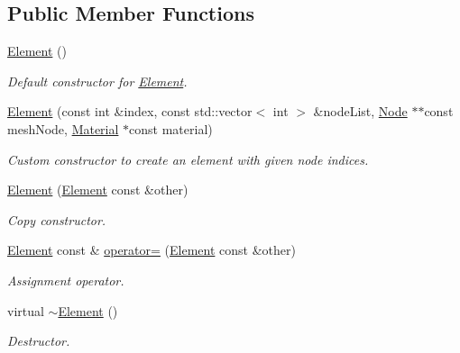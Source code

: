 \subsection*{Public Member Functions}
\begin{DoxyCompactItemize}
\item 
\mbox{\label{class_element_ab0d0e20be9a36ae676202db753faeec9}} 
\mbox{\hyperlink{class_element_ab0d0e20be9a36ae676202db753faeec9}{Element}} ()
\begin{DoxyCompactList}\small\item\em Default constructor for \mbox{\hyperlink{class_element}{Element}}. \end{DoxyCompactList}\item 
\mbox{\hyperlink{class_element_aed93d541257fa2ddd3cd2202fec48bb4}{Element}} (const int \&index, const std\+::vector$<$ int $>$ \&node\+List, \mbox{\hyperlink{class_node}{Node}} $\ast$$\ast$const mesh\+Node, \mbox{\hyperlink{class_material}{Material}} $\ast$const material)
\begin{DoxyCompactList}\small\item\em Custom constructor to create an element with given node indices. \end{DoxyCompactList}\item 
\mbox{\label{class_element_a68700ab3d0e5551cb456e91c3a8fc61b}} 
\mbox{\hyperlink{class_element_a68700ab3d0e5551cb456e91c3a8fc61b}{Element}} (\mbox{\hyperlink{class_element}{Element}} const \&other)
\begin{DoxyCompactList}\small\item\em Copy constructor. \end{DoxyCompactList}\item 
\mbox{\label{class_element_a2baffaa8af3b584a906206d0381cd204}} 
\mbox{\hyperlink{class_element}{Element}} const  \& \mbox{\hyperlink{class_element_a2baffaa8af3b584a906206d0381cd204}{operator=}} (\mbox{\hyperlink{class_element}{Element}} const \&other)
\begin{DoxyCompactList}\small\item\em Assignment operator. \end{DoxyCompactList}\item 
virtual \mbox{\hyperlink{class_element_a13d54ba9c08b6bec651402f1c2bb002c}{$\sim$\+Element}} ()
\begin{DoxyCompactList}\small\item\em Destructor. \end{DoxyCompactList}\item 
$$
\end{DoxyCompactItemize}
